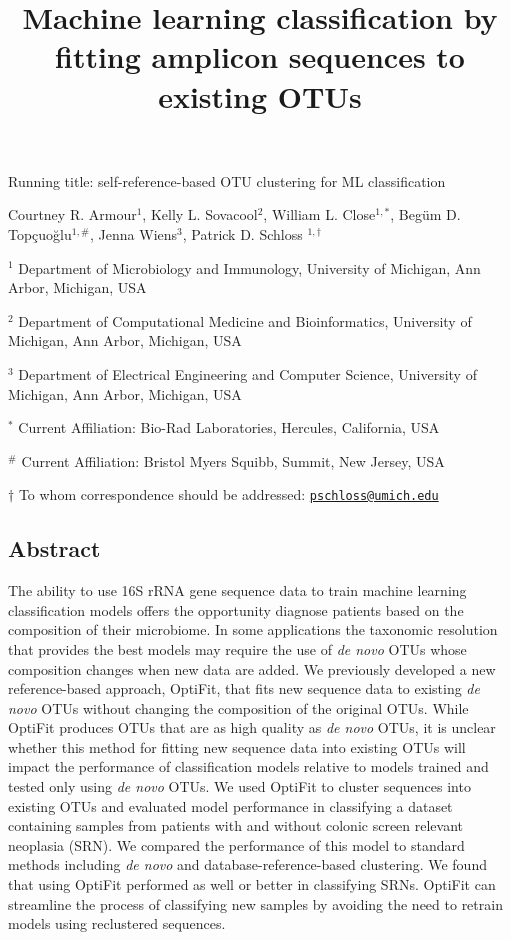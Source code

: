 \documentclass[
]{article}
\title{\textbf{Machine learning classification by fitting amplicon
sequences to existing OTUs}}
\author{}
\date{\vspace{-2.5em}}
\begin{document}
\maketitle

Running title: self-reference-based OTU clustering for ML classification

\vspace{10mm}

Courtney R. Armour\({^1}\), Kelly L. Sovacool\({^2}\), William L.
Close\(^{1,*}\), Begüm D. Topçuoğlu\(^{1,\#}\), Jenna Wiens\({^3}\),
Patrick D. Schloss \(^{1,\dagger}\)

\vspace{10mm}

\({^1}\) Department of Microbiology and Immunology, University of
Michigan, Ann Arbor, Michigan, USA

\({^2}\) Department of Computational Medicine and Bioinformatics,
University of Michigan, Ann Arbor, Michigan, USA

\({^3}\) Department of Electrical Engineering and Computer Science,
University of Michigan, Ann Arbor, Michigan, USA

\({^*}\) Current Affiliation: Bio-Rad Laboratories, Hercules,
California, USA

\({^\#}\) Current Affiliation: Bristol Myers Squibb, Summit, New Jersey,
USA

\(\dagger\) To whom correspondence should be addressed:
\href{mailto:pschloss@umich.edu}{\nolinkurl{pschloss@umich.edu}}

\newpage

\linenumbers

\hypertarget{abstract}{%
\subsection{Abstract}\label{abstract}}

The ability to use 16S rRNA gene sequence data to train machine learning
classification models offers the opportunity diagnose patients based on
the composition of their microbiome. In some applications the taxonomic
resolution that provides the best models may require the use of \emph{de
novo} OTUs whose composition changes when new data are added. We
previously developed a new reference-based approach, OptiFit, that fits
new sequence data to existing \emph{de novo} OTUs without changing the
composition of the original OTUs. While OptiFit produces OTUs that are
as high quality as \emph{de novo} OTUs, it is unclear whether this
method for fitting new sequence data into existing OTUs will impact the
performance of classification models relative to models trained and
tested only using \emph{de novo} OTUs. We used OptiFit to cluster
sequences into existing OTUs and evaluated model performance in
classifying a dataset containing samples from patients with and without
colonic screen relevant neoplasia (SRN). We compared the performance of
this model to standard methods including \emph{de novo} and
database-reference-based clustering. We found that using OptiFit
performed as well or better in classifying SRNs. OptiFit can streamline
the process of classifying new samples by avoiding the need to retrain
models using reclustered sequences.
\end{document}
